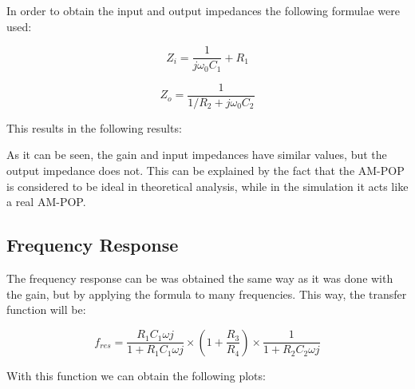  
\vspace{1cm}

In order to obtain the input and output impedances the following formulae were used:
\vspace{0.5cm}
 
\[Z_i = \frac{1}{j\omega _0 C_1} + R_1\tag{7}\label{7}\]
 
 \[Z_o = \frac{1}{1/R_2 + j \omega _0 C_2}\tag{8}\label{8}\]



\vspace{1cm}

This results in the following results:

\vspace{0.5cm}
\begin{center}
\end{center}
\vspace{1cm}

As it can be seen, the gain and input impedances have similar values, but the output impedance does not. This can be explained by the fact that the AM-POP is considered to be ideal in theoretical analysis, while in the simulation it acts like a real AM-POP.  

\subsection{Frequency Response}

\indent

The frequency response can be was obtained the same way as it was done with the gain, but by applying the formula to many frequencies. This way, the transfer function will be:

\vspace{0.5cm}

\[f_{res}=\frac{R_1 C_1 \omega j}{1 + R_1 C_1 \omega j}\times(1 + \frac{R_3}{R_4}) \times \frac{1}{1+ R_2 C_2 \omega j} \tag{9}\label{9}\]

\vspace{0.5cm}
With this function we can obtain the following plots:

\vspace{0.5cm}

\begin{figure}[h]
    \centering
{}
  \hfill
{}
\end{figure}

